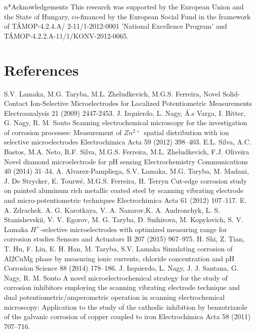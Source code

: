 \documentclass[3p]{elsarticle}
\begin{document}
n*{Acknowledgements}
This research was supported by the European Union and the State of Hungary, co-financed by the European Social Fund in the framework of T\'{A}MOP-4.2.4.A/ 2-11/1-2012-0001 'National Excellence Program' and T\'{A}MOP-4.2.2.A-11/1/KONV-2012-0065.

\section*{References}

\begin{thebibliography}{5}

S.V. Lamaka, M.G. Taryba, M.L. Zheludkevich, M.G.S. Ferreira, Novel Solid-Contact Ion-Selective Microelectrodes for Localized Potentiometric Measurements Electroanalysis 21 (2009) 2447-2453.
J. Izquierdo, L. Nagy, Á.s Varga, I. Bitter, G. Nagy, R. M. Souto Scanning electrochemical microscopy for the investigation of corrosion processes: Measurement of  $Zn^{2+}$ spatial distribution with ion selective microelectrodes Electrochimica Acta 59 (2012) 398–403. 
E.L. Silva, A.C. Bastos, M.A. Neto, R.F. Silva, M.G.S. Ferreira, M.L. Zheludkevich, F.J. Oliveira Novel diamond microelectrode for pH sensing Electrochemistry Communications 40 (2014) 31–34.
A. Alvarez-Pampliega, S.V. Lamaka, M.G. Taryba, M. Madani, J. De Strycker, E. Tourwé, M.G.S. Ferreira, H. Terryn Cut-edge corrosion study on painted aluminum rich metallic coated steel by scanning vibrating electrode and micro-potentiometric techniques Electrochimica Acta 61 (2012) 107–117.	
E. A. Zdrachek. A. G. Karotkaya, V. A. Nazarov,K. A. Andronchyk, L. S. Stanishevskii, V. V. Egorov, M. G. Taryba, D. Snihirova, M. Kopylovich, S. V. Lamaka $H^{+}$-selective microelectrodes with optimized measuring range for corrosion studies  Sensors and Actuators B 207 (2015) 967–975.
H. Shi, Z. Tian, T. Hu, F. Liu, E. H. Han, M. Taryba, S.V. Lamaka Simulating corrosion of Al2CuMg phase by measuring ionic currents, chloride concentration and pH Corrosion Science 88 (2014) 178–186.
J. Izquierdo, L. Nagy, J. J. Santana, G. Nagy, R. M. Souto A novel microelectrochemical strategy for the study of corrosion inhibitors employing the scanning vibrating electrode technique and dual potentiometric/amperometric operation in scanning electrochemical microscopy: Application to the study of the cathodic inhibition by benzotriazole of the galvanic corrosion of copper coupled to iron Electrochimica Acta 58 (2011) 707–716.

\end{thebibliography}
\end{document}
